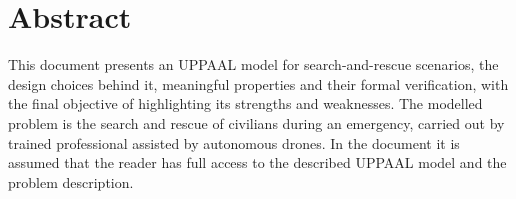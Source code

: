 
\section{Abstract}
This document presents an UPPAAL model for search-and-rescue scenarios, the design choices behind it, meaningful properties and their formal verification, with the final objective of highlighting its strengths and weaknesses.\newline
The modelled problem is the search and rescue of civilians during an emergency, carried out by trained professional assisted by autonomous drones.\newline
In the document it is assumed that the reader has full access to the described UPPAAL model and the problem description.